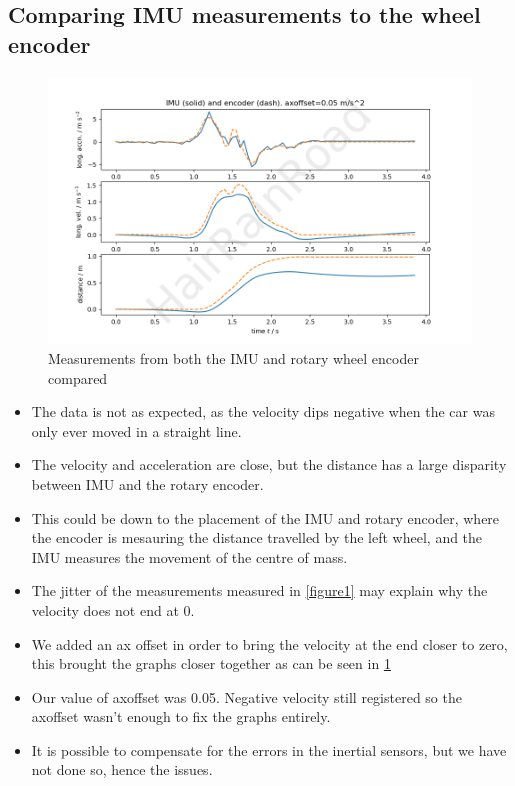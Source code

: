 \documentclass[12pt]{article}
\begin{document}
    \subsection{Comparing IMU measurements to the wheel encoder}
    \begin{figure}[H]
        \captionsetup{labelfont=bf}
        \includegraphics[width=40pc]{fig3png.png}
        \caption{Measurements from both the IMU and rotary wheel encoder compared}\label{figure3}
    \end{figure}
    \begin{itemize}
        \item The data is not as expected, as the velocity dips negative when the car was only ever moved in a straight line.
        \item The velocity and acceleration are close, but the distance has a large disparity between IMU and the rotary encoder.
        \item This could be down to the placement of the IMU and rotary encoder, where the encoder is mesauring the distance
        travelled by the left wheel, and the IMU measures the movement of the centre of mass.
        \item The jitter of the measurements measured in \ref{figure1} may explain why the velocity does not end at 0.
        \item We added an ax offset in order to bring the velocity at the end closer to zero, this brought the graphs closer together
        as can be seen in \ref{figure3}
        \item Our value of axoffset was 0.05. Negative velocity still registered so the axoffset wasn't enough to fix the graphs entirely.
        \item It is possible to compensate for the errors in the inertial sensors, but we have not done so, hence the issues.
    \end{itemize}
    \newpage
\end{document}
